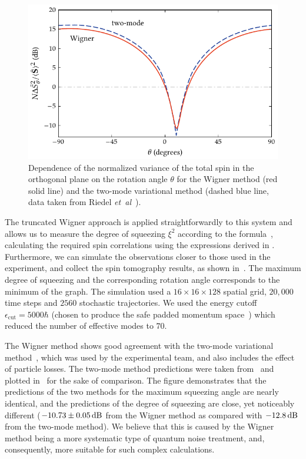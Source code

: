 \begin{figure}
    \centerline{\includegraphics{figures_generated/bec_squeezing/riedel_rotation.pdf}}

    \caption[Wigner simulated spin tomography in the component separation experiment]{
    Dependence of the normalized variance of the total spin in the orthogonal plane on the rotation angle $\theta$ for the Wigner method (red solid line) and the two-mode variational method (dashed blue line, data taken from Riedel \textit{et~al}~\cite{Riedel2010}).
    }%
    \label{fig:bec-squeezing:separation:tomography}
\end{figure}

The truncated Wigner approach is applied straightforwardly to this system and allows us to measure the degree of squeezing $\xi^2$ according to the formula~, calculating the required spin correlations using the expressions derived in .
Furthermore, we can simulate the observations closer to those used in the experiment, and collect the spin tomography results, as shown in~.
The maximum degree of squeezing and the corresponding rotation angle corresponds to the minimum of the graph.
The simulation used a $16\times16\times128$ spatial grid, $20,000$ time steps and $2560$ stochastic trajectories.
We used the energy cutoff $\epsilon_{\mathrm{cut}} = 5000\hbar$ (chosen to produce the safe padded momentum space~\cite{Norrie2006}) which reduced the number of effective modes to $70$.

The Wigner method shows good agreement with the two-mode variational method~\cite{Li2009}, which was used by the experimental team, and also includes the effect of particle losses.
The two-mode method predictions were taken from~\cite{Riedel2010} and plotted in~ for the sake of comparison.
The figure demonstrates that the predictions of the two methods for the maximum squeezing angle are nearly identical, and the predictions of the degree of squeezing are close, yet noticeably different ($-10.73\pm0.05\mbox{\ensuremath{\,\mathrm{dB}}}$ from the Wigner method as compared with $-12.8\mbox{\ensuremath{\,\mathrm{dB}}}$ from the two-mode method).
We believe that this is caused by the Wigner method being a more systematic type of quantum noise treatment, and, consequently, more suitable for such complex calculations.

